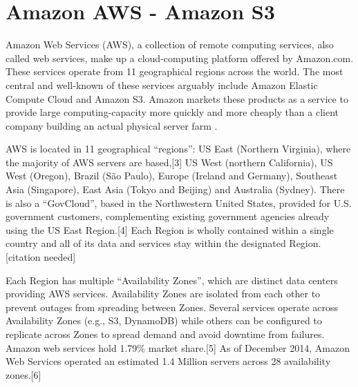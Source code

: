 \section{Amazon AWS - Amazon S3}
\label{sec:TCH_html5}

Amazon Web Services (AWS), a collection of remote computing services, also called web services, make up a cloud-computing platform offered by Amazon.com.\cite{aws_overview} These services operate from 11 geographical regions across the world. The most central and well-known of these services arguably include Amazon Elastic Compute Cloud and Amazon S3. Amazon markets these products as a service to provide large computing-capacity more quickly and more cheaply than a client company building an actual physical server farm \cite{aws_cloud}.

AWS is located in 11 geographical ``regions'': US East (Northern Virginia), where the majority of AWS servers are based,[3] US West (northern California), US West (Oregon), Brazil (São Paulo), Europe (Ireland and Germany), Southeast Asia (Singapore), East Asia (Tokyo and Beijing) and Australia (Sydney). There is also a ``GovCloud'', based in the Northwestern United States, provided for U.S. government customers, complementing existing government agencies already using the US East Region.[4] Each Region is wholly contained within a single country and all of its data and services stay within the designated Region.[citation needed]

Each Region has multiple ``Availability Zones'', which are distinct data centers providing AWS services. Availability Zones are isolated from each other to prevent outages from spreading between Zones. Several services operate across Availability Zones (e.g., S3, DynamoDB) while others can be configured to replicate across Zones to spread demand and avoid downtime from failures. Amazon web services hold 1.79\% market share.[5] As of December 2014, Amazon Web Services operated an estimated 1.4 Million servers across 28 availability zones.[6]